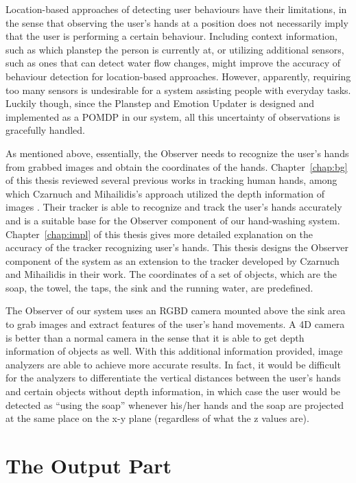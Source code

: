 Location-based approaches of detecting user behaviours have their limitations, in the sense that observing the user's hands at a position does not necessarily imply that the user is performing a certain behaviour. Including context information, such as which planstep the person is currently at, or utilizing additional sensors, such as ones that can detect water flow changes, might improve the accuracy of behaviour detection for location-based approaches. However, apparently, requiring too many sensors is undesirable for a system assisting people with everyday tasks. Luckily though, since the Planstep and Emotion Updater is designed and implemented as a POMDP in our system, all this uncertainty of observations is gracefully handled.

As mentioned above, essentially, the Observer needs to recognize the user's hands from grabbed images and obtain the coordinates of the hands. Chapter~\ref{chap:bg} of this thesis reviewed several previous works in tracking human hands, among which Czarnuch and Mihailidis's approach utilized the depth information of images \cite{czarnuch2014}. Their tracker is able to recognize and track the user's hands accurately and is a suitable base for the Observer component of our hand-washing system. Chapter~\ref{chap:impl} of this thesis gives more detailed explanation on the accuracy of the tracker recognizing user's hands. This thesis designs the Observer component of the system as an extension to the tracker developed by Czarnuch and Mihailidis in their work. The coordinates of a set of objects, which are the soap, the towel, the taps, the sink and the running water, are predefined. 

The Observer of our system uses an RGBD camera mounted above the sink area to grab images and extract features of the user's hand movements. A 4D camera is better than a normal camera in the sense that it is able to get depth information of objects as well. With this additional information provided, image analyzers are able to achieve more accurate results. In fact, it would be difficult for the analyzers to differentiate the vertical distances between the user's hands and certain objects without depth information, in which case the user would be detected as ``using the soap'' whenever his/her hands and the soap are projected at the same place on the x-y plane (regardless of what the z values are). 

\section{The Output Part}
\label{sec:design-output}


